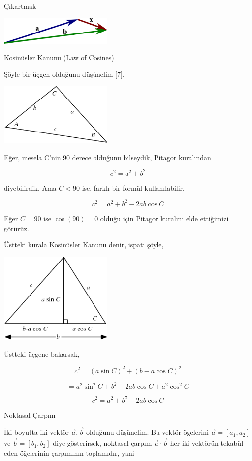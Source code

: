 \documentclass[12pt,fleqn]{article}\usepackage{../../common}
\begin{document}
Çıkartmak

\includegraphics[width=15em]{vector_b_minus_a.png}

Kosinüsler Kanunu (Law of Cosines)

Şöyle bir üçgen olduğunu düşünelim [7],

\includegraphics[width=15em]{cos1.png}

Eğer, mesela C'nin 90 derece olduğunu bilseydik, Pitagor kuralından

$$
c^2 = a^2 + b^2
$$

diyebilirdik. Ama $C < 90$ ise, farklı bir formül kullanılabilir,

$$
c^2 = a^2 + b^2 - 2 a b \cos C
$$

Eğer $C=90$ ise $\cos(90) = 0$ olduğu için Pitagor kuralını elde ettiğimizi
görürüz. 

Üstteki kurala Kosinüsler Kanunu denir, ispatı şöyle,

\includegraphics[width=15em]{cos2.png}

Üstteki üçgene bakarsak,

$$
c^2 = (a \sin C)^2 + (b-a\cos C)^2
$$

$$
= a^2 \sin^2 C + b^2 - 2 a b \cos C + a^2 \cos^2 C
$$

$$
c^2 = a^2 + b^2 - 2 a b \cos C
$$

Noktasal Çarpım

İki boyutta iki vektör $\vec{a},\vec{b}$ olduğunu düşünelim. Bu vektör ögelerini
$\vec{a} = [a_1, a_2]$ ve $\vec{b} = [b_1, b_2]$ diye gösterirsek, noktasal
çarpım $\vec{a} \cdot \vec{b}$ her iki vektörün tekabül eden öğelerinin
çarpımının toplamıdır, yani
\end{document}
